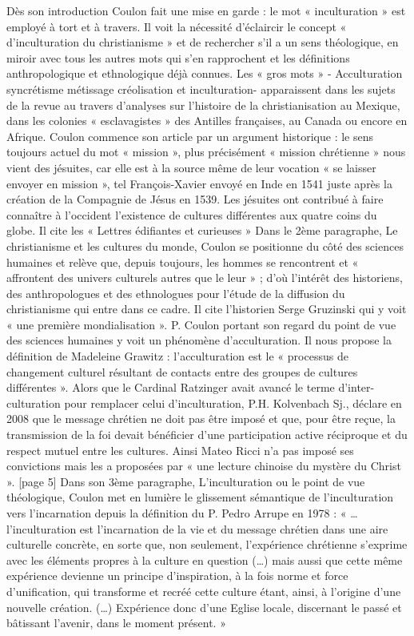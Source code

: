 Dès son introduction Coulon fait une mise en garde : le mot « inculturation » est employé à tort et à travers. Il voit la nécessité d’éclaircir le concept « d’inculturation du christianisme » et de rechercher s’il a un sens théologique, en miroir avec tous les autres mots qui s’en rapprochent et les définitions anthropologique et ethnologique déjà connues.  Les « gros mots » - Acculturation syncrétisme métissage créolisation et inculturation- apparaissent dans les sujets de la revue au travers d’analyses sur l’histoire de la christianisation au Mexique, dans les colonies « esclavagistes » des Antilles françaises, au Canada ou encore en Afrique. 
Coulon commence son article par un argument historique : le sens toujours actuel du mot « mission », plus précisément « mission chrétienne » nous vient des jésuites, car elle est à la source même de leur vocation « se laisser envoyer en mission », tel François-Xavier envoyé en Inde en 1541 juste après la création de la Compagnie de Jésus en 1539. Les jésuites ont contribué à faire connaître à l’occident l’existence de cultures différentes aux quatre coins du globe. Il cite les « Lettres édifiantes et curieuses »  
Dans le 2ème paragraphe, Le christianisme et les cultures du monde, Coulon se positionne du côté des sciences humaines et relève que, depuis toujours, les hommes se rencontrent et « affrontent des univers culturels autres que le leur » ; d’où l’intérêt des historiens, des anthropologues et des ethnologues pour l’étude de la diffusion du christianisme qui entre dans ce cadre. Il cite l’historien Serge Gruzinski qui y voit « une première mondialisation ». 
P. Coulon portant son regard du point de vue des sciences humaines y voit un phénomène d’acculturation. Il nous propose la définition de Madeleine Grawitz  : l’acculturation est le « processus de changement culturel résultant de contacts entre des groupes de cultures différentes ». 
Alors que le Cardinal Ratzinger avait avancé le terme d’inter-culturation pour remplacer celui d’inculturation, P.H. Kolvenbach Sj., déclare en 2008 que le message chrétien ne doit pas être imposé et que, pour être reçue, la transmission de la foi devait bénéficier d’une participation active réciproque et du respect mutuel entre les cultures. Ainsi Mateo Ricci n’a pas imposé ses convictions mais les a proposées par « une lecture chinoise du mystère du Christ ». [page 5]
Dans son 3ème paragraphe, L’inculturation ou le point de vue théologique, Coulon met en lumière le glissement sémantique de l’inculturation vers l’incarnation depuis la définition du P. Pedro Arrupe en 1978 : « …l’inculturation est l’incarnation de la vie et du message chrétien dans une aire culturelle concrète, en sorte que, non seulement, l’expérience chrétienne s’exprime avec les éléments propres à la culture en question (…) mais aussi que cette même expérience devienne un principe d’inspiration, à la fois norme et force d’unification, qui transforme et recréé cette culture étant, ainsi, à l’origine d’une nouvelle création. (…) Expérience donc d’une Eglise locale, discernant le passé et bâtissant l’avenir, dans le moment présent. »  
